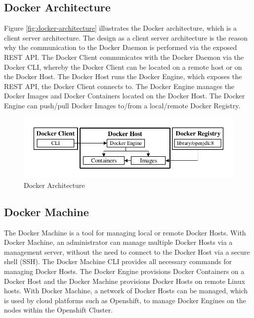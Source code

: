 \subsection{Docker Architecture}
\label{sec:docker-architecture}
Figure \vref{fig:docker-architecture} illustrates the Docker architecture, which is a client server architecture. The design as a client server architecture is the reason why the communication to the Docker Daemon is performed via the exposed REST API. The Docker Client communicates with the Docker Daemon via the Docker CLI, whereby the Docker Client can be located on a remote host or on the Docker Host. The Docker Host runs the Docker Engine, which exposes the REST API, the Docker Client connects to. The Docker Engine manages the Docker Images and Docker Containers located on the Docker Host. The Docker Engine can push/pull Docker Images to/from a local/remote Docker Registry.

\begin{figure}[htbp]
	\centering
	\includegraphics[scale=1]{images/docker-architecture.pdf}
	\caption{Docker Architecture}
	\label{fig:docker-architecture}
\end{figure} 

\subsection{Docker Machine}
\label{sec:docker-machine}
The Docker Machine is a tool for managing local or remote Docker Hosts. With Docker Machine, an administrator can manage multiple Docker Hosts via a management server, without the need to connect to the Docker Host via a secure shell (SSH). The Docker Machine CLI provides all necessary commands for managing Docker Hosts. The Docker Engine provisions Docker Containers on a Docker Host and the Docker Machine provisions Docker Hosts on remote Linux hosts. With Docker Machine, a network of Docker Hosts can be managed, which is used by cloud platforms such as Openshift, to manage Docker Engines on the nodes within the Openshift Cluster\cite{DockerMachine2018}.  

